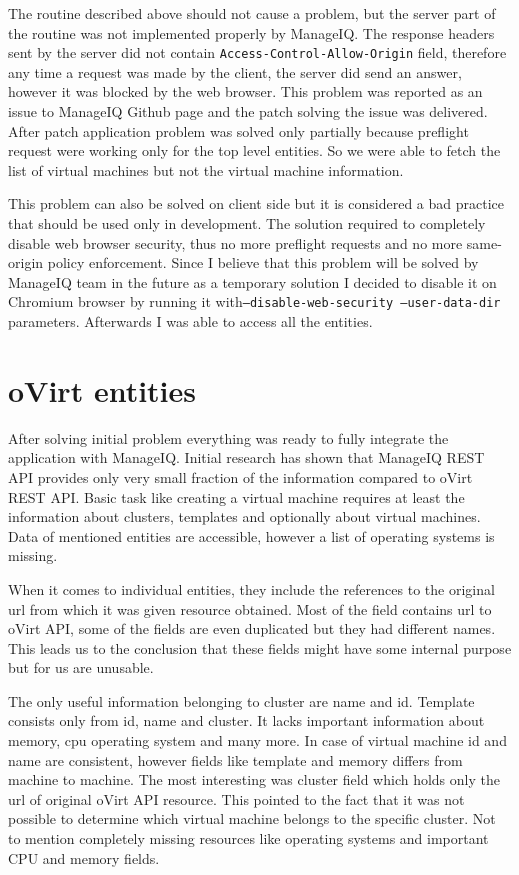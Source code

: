 The routine described above should not cause a problem, but the server part of the routine was not implemented properly by ManageIQ. The response headers sent by the server did not contain \texttt{Access-Control-Allow-Origin} field, therefore any time a request was made by the client, the server did send an answer, however it was blocked by the web browser. This problem was reported as an issue to ManageIQ Github page and the patch solving the issue was delivered. After patch application problem was solved only partially because preflight request were working only for the top level entities. So we were able to fetch the list of virtual machines but not the virtual machine information.

This problem can also be solved on client side but it is considered a bad practice that should be used only in development. The solution required to completely disable web browser security, thus no more preflight requests and no more same-origin policy enforcement. Since I believe that this problem will be solved by ManageIQ team in the future as a temporary solution I decided to disable it on Chromium browser by running it with\texttt{--disable-web-security --user-data-dir} parameters. Afterwards I was able to access all the entities.

\section{oVirt entities}
After solving initial problem everything was ready to fully integrate the application with ManageIQ. Initial research has shown that ManageIQ REST API provides only very small fraction of the information compared to oVirt REST API.
Basic task like creating a virtual machine requires at least the information about clusters, templates and optionally about virtual machines. Data of mentioned entities are accessible, however a list of operating systems is missing. 

When it comes to individual entities, they include the references to the original url from which it was given resource obtained. Most of the field contains url to oVirt API, some of the fields are even duplicated but they had different names. This leads us to the conclusion that these fields might have some internal purpose but for us are unusable. 

The only useful information belonging to cluster are name and id. Template consists only from id, name and cluster. It lacks important information about memory, cpu operating system and many more. In case of virtual machine id and name are consistent, however fields like template and memory differs from machine to machine. The most interesting was cluster field which holds only the url of original oVirt API resource. This pointed to the fact that it was not possible to determine which virtual machine belongs to the specific cluster. Not to mention completely missing resources like operating systems and important CPU and memory fields.

